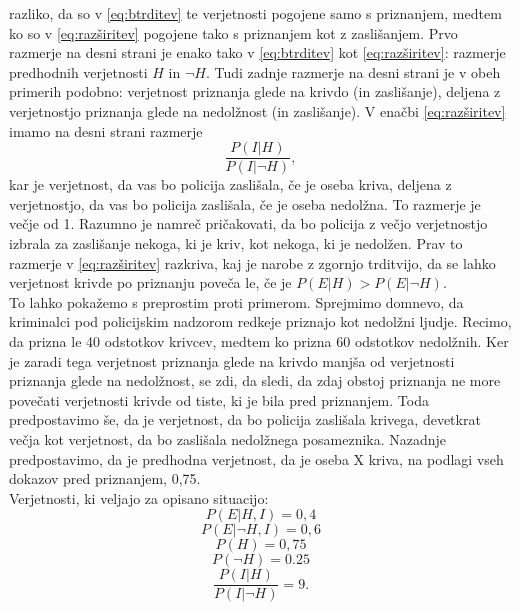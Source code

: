 \documentclass[fin1, tisk]{fmfdelo}
\theoremstyle{definition}
\theoremstyle{trditev}
\theoremstyle{izrek}
\begin{document}
razliko, da so v \eqref{eq:btrditev} te verjetnosti pogojene samo s priznanjem, medtem ko so v \eqref{eq:razširitev} pogojene tako s priznanjem kot z zaslišanjem. Prvo razmerje na desni strani je enako 
tako v \eqref{eq:btrditev} kot \eqref{eq:razširitev}: razmerje predhodnih verjetnosti $H$ in $\neg H$. Tudi zadnje razmerje na desni strani je v obeh primerih podobno: verjetnost priznanja glede na 
krivdo (in zaslišanje), deljena z verjetnostjo priznanja glede na nedolžnost (in zaslišanje). V enačbi \eqref{eq:razširitev} imamo na desni strani razmerje 
\[\frac{P(I \lvert H)}{P(I \lvert \neg H)},\] kar je verjetnost, da vas bo policija zaslišala, če je oseba kriva, deljena z verjetnostjo, da vas bo policija 
zaslišala, če je oseba nedolžna. To razmerje je večje od 1. Razumno je namreč pričakovati, da bo policija z večjo verjetnostjo izbrala za zaslišanje nekoga, 
ki je kriv, kot nekoga, ki je nedolžen. Prav to razmerje v \eqref{eq:razširitev} razkriva, kaj je narobe z zgornjo trditvijo, da se lahko verjetnost krivde po priznanju poveča le, 
če je $P(E \lvert H) > P(E \lvert \neg H)$. \\
To lahko pokažemo s preprostim proti primerom. Sprejmimo domnevo, da kriminalci pod policijskim nadzorom redkeje priznajo kot nedolžni ljudje. Recimo, da prizna 
le 40 odstotkov krivcev, medtem ko prizna 60 odstotkov nedolžnih. Ker je zaradi tega verjetnost priznanja glede na krivdo manjša od verjetnosti priznanja glede 
na nedolžnost, se zdi, da sledi, da zdaj obstoj priznanja ne more povečati verjetnosti krivde od tiste, ki je bila pred priznanjem. Toda predpostavimo še, 
da je verjetnost, da bo policija zaslišala krivega, devetkrat večja kot verjetnost, da bo zaslišala nedolžnega posameznika. Nazadnje predpostavimo, da je 
predhodna verjetnost, da je oseba X kriva, na podlagi vseh dokazov pred priznanjem, 0,75. \\
Verjetnosti, ki veljajo za opisano situacijo:\\ \vspace{2mm}
\[P(E \lvert H, I)  = 0,4  \]
\[P(E \lvert \neg H, I) = 0,6  \]
\[P(H) = 0,75  \]
\[P(\neg H) = 0.25  \]
\[\frac{P(I \lvert H)}{P(I \lvert \neg H)} = 9. \]
\end{document}
